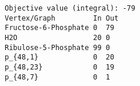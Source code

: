 \begin{verbatim}
Objective value (integral): -79
Vertex/Graph         In Out 
Fructose-6-Phosphate 0  79  
H2O                  20 0   
Ribulose-5-Phosphate 99 0   
p_{48,1}             0  20  
p_{48,23}            0  19  
p_{48,7}             0  1   
\end{verbatim}
